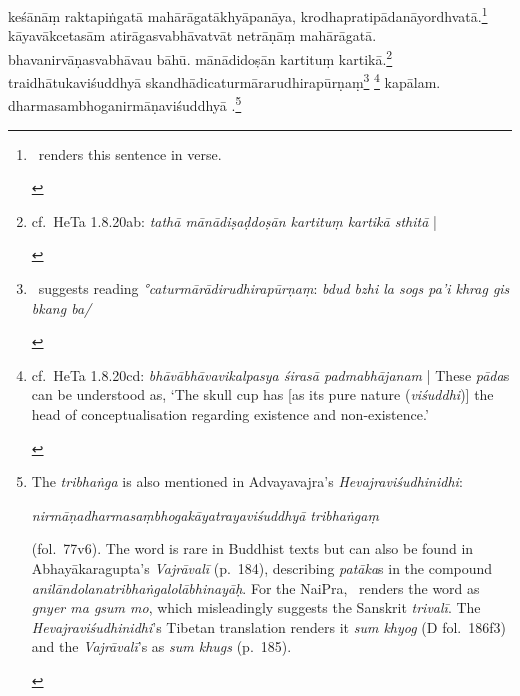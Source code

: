 \documentclass[naipra.tex]{subfiles}
\begin{document}
\begin{sanskrit}
\medskip\pstart
keśānāṃ raktapiṅgatā mahārāgatākhyāpanāya, krodhapratipādanāyordhvatā.\footnote{
	\begin{english}%
		\TIB\ renders this sentence in verse.
	\end{english}
}
kāyavākcetasām atirāgasvabhāvatvāt  netrāṇāṃ mahārāgatā.
bhavanirvāṇasvabhāvau bāhū.
mānādidoṣān kartituṃ kartikā.\footnote{
	\begin{english}%
		cf.\ HeTa 1.8.20ab: \emph{tathā mānādiṣaḍdoṣān kartituṃ kartikā sthitā} |
	\end{english}
}
traidhātukaviśuddhyā skandhādicaturmārarudhirapūrṇaṃ\footnote{
	\begin{english}%
		\TIB\ suggests reading \emph{°caturmārādirudhirapūrṇaṃ}: \emph{bdud bzhi la sogs pa'i khrag gis bkang ba/} 
	\end{english}
}  \footnote{
	\begin{english}%
		cf.\ HeTa 1.8.20cd: \emph{bhāvābhāvavikalpasya śirasā padmabhājanam} | These \emph{pāda}s can be understood as, `The skull cup has [as its pure nature (\emph{viśuddhi})] the head of conceptualisation regarding existence and non-existence.'
	\end{english}
} kapālam.
dharmasambhoganirmāṇaviśuddhyā .\footnote{
	\begin{english}%
		The \emph{tribhaṅga} is also mentioned in Advayavajra's \emph{Hevajraviśudhinidhi}: \begin{sanskrit}\emph{nirmāṇadharmasaṃbhogakāyatrayaviśuddhyā tribhaṅgaṃ}\end{sanskrit} (fol.\ 77v6).
		The word is rare in Buddhist texts but can also be found in Abhayākaragupta's \emph{Vajrāvalī} (p.\ 184), describing \emph{patāka}s in the compound \emph{anilāndolanatribhaṅgalolābhinayāḥ}.
		For the NaiPra, \TIB\ renders the word as \emph{gnyer ma gsum mo}, which misleadingly suggests the Sanskrit \emph{trivalī}.
		The \emph{Hevajraviśudhinidhi}'s Tibetan translation renders it \emph{sum khyog} (D fol.\ 186f3) and the \emph{Vajrāvalī}'s as \emph{sum khugs} (p.\ 185).
	\end{english}
} %

\end{sanskrit}
\end{document}
